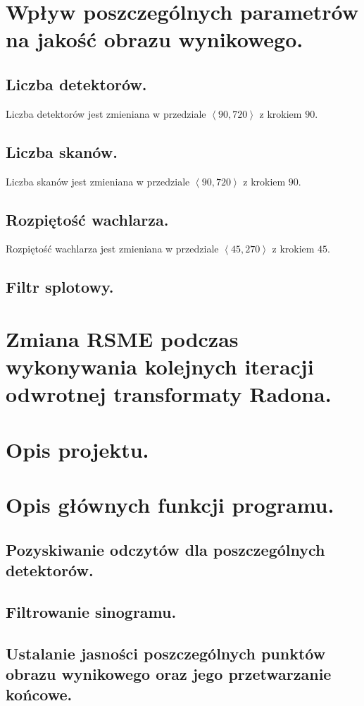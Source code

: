 \documentclass[a4paper, 11pt]{article}
\begin{document}
\section{Wpływ poszczególnych parametrów na jakość obrazu wynikowego.}
\subsection{Liczba detektorów.}

Liczba detektorów jest zmieniana w przedziale $\left<90, 720 \right>$ z krokiem $90$.
\subsection{Liczba skanów.}

Liczba skanów jest zmieniana w przedziale $\left<90, 720 \right>$ z krokiem $90$.
\subsection{Rozpiętość wachlarza.}

Rozpiętość wachlarza jest zmieniana w przedziale $\left<45, 270 \right>$ z krokiem $45$.
\subsection{Filtr splotowy.}

\section{Zmiana RSME podczas wykonywania kolejnych iteracji odwrotnej transformaty Radona.}

	\section{Opis projektu.}
	\section{Opis głównych funkcji programu.}
	\subsection{Pozyskiwanie odczytów dla poszczególnych detektorów.}
	\subsection{Filtrowanie sinogramu.}
	\subsection{Ustalanie jasności poszczególnych punktów obrazu wynikowego oraz jego przetwarzanie końcowe.}
\end{document}
